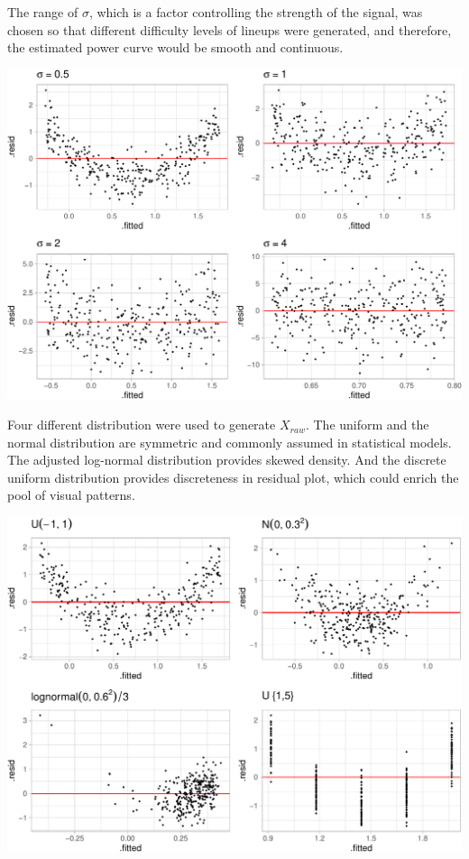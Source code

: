 \documentclass[]{interact}
\theoremstyle{plain}%
\theoremstyle{definition}
\theoremstyle{remark}
\begin{document}
The range of \(\sigma\), which is a factor controlling the strength of
the signal, was chosen so that different difficulty levels of lineups
were generated, and therefore, the estimated power curve would be smooth
and continuous.

\includegraphics[width=1\linewidth]{paper_comparison_files/figure-latex/different-sigma-1}

Four different distribution were used to generate \(X_{raw}\). The
uniform and the normal distribution are symmetric and commonly assumed
in statistical models. The adjusted log-normal distribution provides
skewed density. And the discrete uniform distribution provides
discreteness in residual plot, which could enrich the pool of visual
patterns.

\includegraphics[width=1\linewidth]{paper_comparison_files/figure-latex/different-dist-1}
\end{document}
